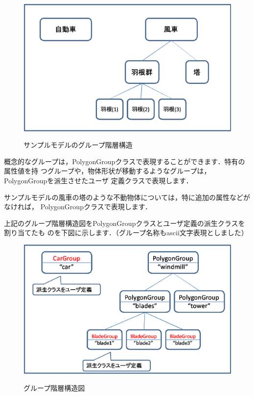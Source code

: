 {\begin{figure}[H]
 \centering
 \includegraphics[scale=0.5]{clip008.eps}\\
 \caption{サンプルモデルのグループ階層構造}
\end{figure}

概念的なグループは，PolygonGroupクラスで表現することができます．特有の属性値を持
つグループや，物体形状が移動するようなグループは，PolygonGroupを派生させたユーザ
定義クラスで表現します．

サンプルモデルの風車の塔のような不動物体については，特に追加の属性などがなければ，
PolygonGroupクラスで表現します．

上記のグループ階層構造図をPolygonGroupクラスとユーザ定義の派生クラスを割り当てたも
のを下図に示します．（グループ名称もascii文字表現としました）

\begin{figure}[H]
 \centering
 \includegraphics[scale=0.5]{clip009.eps}\\
 \caption{グループ階層構造図}
\end{figure}

}
